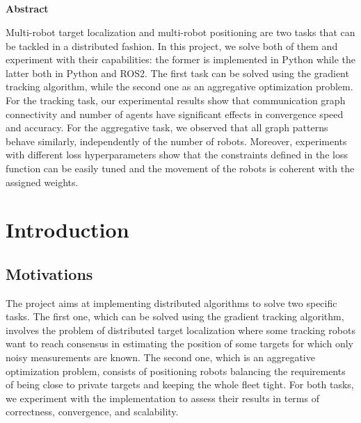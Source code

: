 \documentclass[a4paper,11pt,oneside]{book}
\begin{document}
\newpage
\thispagestyle{empty}

\begin{center}
\chapter*{}
\thispagestyle{empty}
{\Huge \textbf{Abstract}}\\
\vspace{15mm}
\end{center}

Multi-robot target localization and multi-robot positioning are two tasks that can be tackled in a distributed fashion. In this project, we solve both of them and experiment with their capabilities: the former is implemented in Python while the latter both in Python and ROS2. The first task can be solved using the gradient tracking algorithm, while the second one as an aggregative optimization problem. For the tracking task, our experimental results show that communication graph connectivity and number of agents have significant effects in convergence speed and accuracy. For the aggregative task, we observed that all graph patterns behave similarly, independently of the number of robots. Moreover, experiments with different loss hyperparameters show that the constraints defined in the loss function can be easily tuned and the movement of the robots is coherent with the assigned weights.

\tableofcontents \thispagestyle{empty}

\chapter*{Introduction}

\section*{Motivations} 

The project aims at implementing distributed algorithms to solve two specific tasks. The first one, which can be solved using the gradient tracking algorithm, involves the problem of distributed target localization where some tracking robots want to reach consensus in estimating the position of some targets for which only noisy measurements are known. The second one, which is an aggregative optimization problem, consists of positioning robots balancing the requirements of being close to private targets and keeping the whole fleet tight. For both tasks, we experiment with the implementation to assess their results in terms of correctness, convergence, and scalability.
\end{document}
